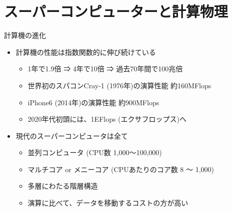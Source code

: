 \section{スーパーコンピューターと計算物理}

\begin{frame}[t,fragile]{計算機の進化}
  \begin{itemize}
    \setlength{\itemsep}{1em}
  \item 計算機の性能は指数関数的に伸び続けている
    \begin{itemize}
    \item 1年で1.9倍 ⇒ 4年で10倍 ⇒ 過去70年間で100兆倍
    \item 世界初のスパコンCray-1 (1976年)の演算性能 約160MFlops
    \item iPhone6 (2014年)の演算性能 約900MFlops
    \item 2020年代初頭には、1EFlops (エクサフロップス)へ
    \end{itemize}
  \item 現代のスーパーコンピュータは全て
    \begin{itemize}
      \item 並列コンピュータ (CPU数 1,000〜100,000)
      \item マルチコア or メニーコア (CPUあたりのコア数 8 〜 1,000)
      \item 多層にわたる階層構造
      \item 演算に比べて、データを移動するコストの方が高い
    \end{itemize}
  \end{itemize}
\end{frame}
